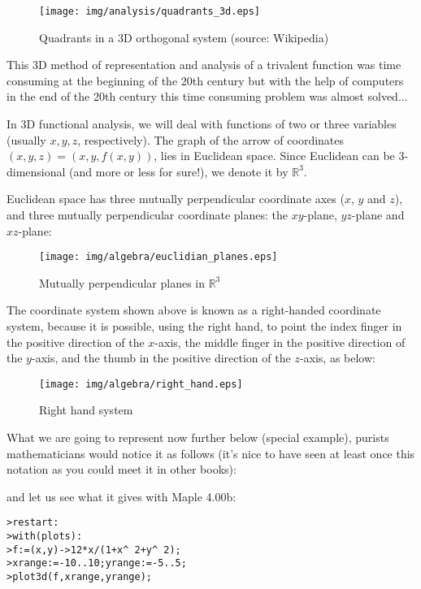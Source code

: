 \begin{figure}[H]
\centering
\texttt{[image: img/analysis/quadrants\_3d.eps]}
\caption[Quadrants in a 3D orthogonal system]{Quadrants in a 3D orthogonal system (source: Wikipedia)}
\end{figure}

This 3D method of representation and analysis of a trivalent function was time consuming at the beginning of the 20th century but with the help of computers in the end of the 20th century this time consuming problem was almost solved...

In 3D functional analysis, we will deal with functions of two or three variables (usually  $x, y, z$, respectively). The graph of the arrow of coordinates $(x, y, z)=(x,y,f(x,y))$, lies in Euclidean space. Since Euclidean can be 3-dimensional (and more or less for sure!), we denote it by $\mathbb{R}^3$.

Euclidean space has three mutually perpendicular coordinate axes ($x$, $y$ and $z$), and three mutually perpendicular coordinate planes: the $xy$-plane, $yz$-plane and $xz$-plane:

\begin{figure}[H]
\centering
\texttt{[image: img/algebra/euclidian\_planes.eps]}
\caption{Mutually perpendicular planes in $\mathbb{R}^3$}
\end{figure}

The coordinate system shown above is known as a right-handed coordinate system, because it is possible, using the right hand, to point the index finger in the positive direction of the $x$-axis, the middle finger in the positive direction of the $y$-axis, and the thumb in the positive direction of the $z$-axis, as below:

\begin{figure}[H]
\centering
\texttt{[image: img/algebra/right\_hand.eps]}
\caption{Right hand system}
\end{figure}

What we are going to represent now further below (special example), purists mathematicians would notice it as follows (it's nice to have seen at least once this notation as you could meet it in other books):
	
and let us see what it gives with  Maple 4.00b:

\texttt{>restart:}\\
\texttt{>with(plots):}\\
\texttt{>f:=(x,y)->12*x/(1+x\string^ 2+y\string^ 2);}\\
\texttt{>xrange:=-10..10;yrange:=-5..5;}\\
\texttt{>plot3d(f,xrange,yrange);}

